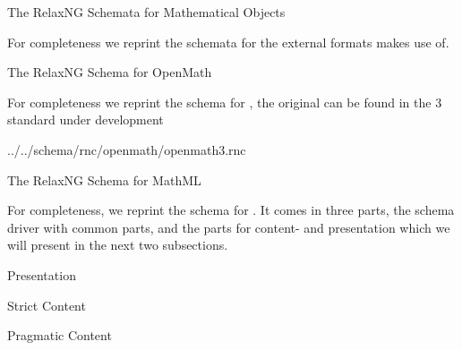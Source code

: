 
\begin{omgroup}[id=mobj-rnc]{The RelaxNG Schemata for Mathematical Objects}

For completeness we reprint the {\relaxng} schemata for the external formats
\omdoc makes use of.

\begin{omgroup}[id=rnc.openm]{The RelaxNG Schema for OpenMath}

For completeness we reprint the {\relaxng} schema for {\openmath}, the original can be
found in the {\openmath}3 standard under development


{../../schema/rnc/openmath/openmath3.rnc}
\end{omgroup}

\begin{omgroup}[id=rnc.mathml]{The RelaxNG Schema for MathML}

For completeness, we reprint the {\relaxng} schema for {\mathml}. It comes in three parts,
the schema driver with common parts, and the parts for content- and presentation {\mathml} which we will
present in the next two subsections.



\end{omgroup}

\begin{omgroup}[id=rnc.pmathml]{Presentation {\mathml}}

\end{omgroup}

\begin{omgroup}[id=rnc.cmathml]{Strict Content {\mathml}}
  
\end{omgroup}

\begin{omgroup}[id=rnc.cmathml]{Pragmatic Content {\mathml}}
  
\end{omgroup}
\end{omgroup}


